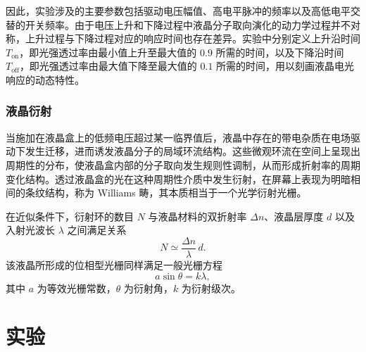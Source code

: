 \documentclass[a4paper, 1.5lines]{ctexart}
\begin{document}
因此，实验涉及的主要参数包括驱动电压幅值、高电平脉冲的频率以及高低电平交替的开关频率。由于电压上升和下降过程中液晶分子取向演化的动力学过程并不对称，上升过程与下降过程对应的响应时间也存在差异。实验中分别定义上升沿时间 $T_{\text{on}}$，即光强透过率由最小值上升至最大值的 $0.9$ 所需的时间，以及下降沿时间 $T_{\text{off}}$，即光强透过率由最大值下降至最大值的 $0.1$ 所需的时间，用以刻画液晶电光响应的动态特性。

\subsubsection{液晶衍射}

当施加在液晶盒上的低频电压超过某一临界值后，液晶中存在的带电杂质在电场驱动下发生迁移，进而诱发液晶分子的局域环流结构。这些微观环流在空间上呈现出周期性的分布，使液晶盒内部的分子取向发生规则性调制，从而形成折射率的周期变化结构。透过液晶盒的光在这种周期性介质中发生衍射，在屏幕上表现为明暗相间的条纹结构，称为 Williams 畴，其本质相当于一个光学衍射光栅。

在近似条件下，衍射环的数目 $N$ 与液晶材料的双折射率 $\Delta n$、液晶层厚度 $d$ 以及入射光波长 $\lambda$ 之间满足关系
\begin{equation}
    N \simeq \frac{\Delta n}{\lambda}\, d .
\end{equation}
该液晶所形成的位相型光栅同样满足一般光栅方程
\begin{equation}
    a \sin\theta = k \lambda ,
\end{equation}
其中 $a$ 为等效光栅常数，$\theta$ 为衍射角，$k$ 为衍射级次。

\section{实验}
\end{document}
